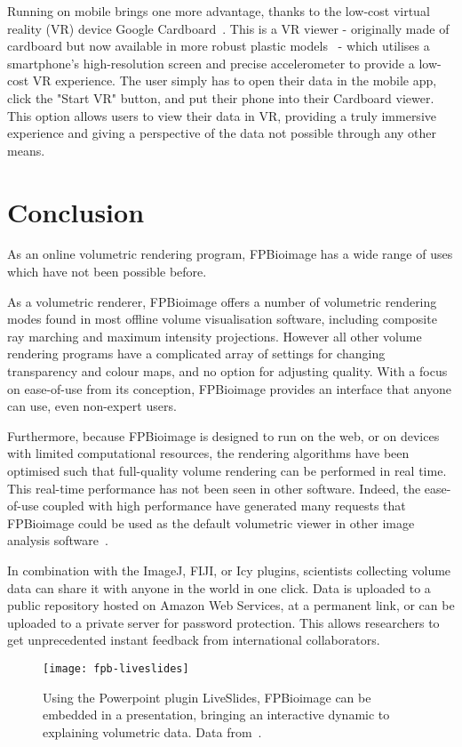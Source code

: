 Running on mobile brings one more advantage, thanks to the low-cost virtual reality (VR) device Google Cardboard~\cite{cardboard}.
This is a VR viewer - originally made of cardboard but now available in more robust plastic models~\cite{get2018cardboard} - which utilises a smartphone's high-resolution screen and precise accelerometer to provide a low-cost VR experience.
The user simply has to open their data in the mobile app, click the "Start VR" button, and put their phone into their Cardboard viewer.
This option allows users to view their data in VR, providing a truly immersive experience and giving a perspective of the data not possible through any other means.


\section{Conclusion}
As an online volumetric rendering program, FPBioimage has a wide range of uses which have not been possible before.

As a volumetric renderer, FPBioimage offers a number of volumetric rendering modes found in most offline volume visualisation software, including composite ray marching and maximum intensity projections.
However all other volume rendering programs have a complicated array of settings for changing transparency and colour maps, and no option for adjusting quality.
With a focus on ease-of-use from its conception, FPBioimage provides an interface that anyone can use, even non-expert users.

Furthermore, because FPBioimage is designed to run on the web, or on devices with limited computational resources, the rendering algorithms have been optimised such that full-quality volume rendering can be performed in real time.
This real-time performance has not been seen in other software.
Indeed, the ease-of-use coupled with high performance have generated many requests that FPBioimage could be used as the default volumetric viewer in other image analysis software~\cite{twitter2018fantm}.

In combination with the ImageJ, FIJI, or Icy plugins, scientists collecting volume data can share it with anyone in the world in one click.
Data is uploaded to a public repository hosted on Amazon Web Services, at a permanent link, or can be uploaded to a private server for password protection.
This allows researchers to get unprecedented instant feedback from international collaborators.

\begin{figure}[htbp!]
\centering
\texttt{[image: fpb-liveslides]}
\caption[FPBioimage: LiveSlides in Powerpoint brings interactive FPBioimage rendering to presentations]{Using the Powerpoint plugin LiveSlides, FPBioimage can be embedded in a presentation, bringing an interactive dynamic to explaining volumetric data. Data from~\cite{kumar2014dual}. } %
\label{fig:fpb-liveslides}
\end{figure}

